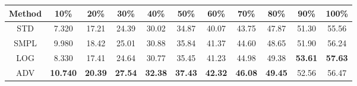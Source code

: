 \documentclass{standalone}
\begin{document}
\begin{tabular}{c|cccccccccc}
      \toprule
      Method & 10\% & 20\% & 30\% & 40\% & 50\% & 60\% & 70\% & 80\% & 90\% & 100\% \\
      \midrule
STD & 7.320 & 17.21 & 24.39 & 30.02 & 34.87 & 40.07 & 43.75 & 47.87 & 51.30 & 55.56\\
SMPL & 9.980 & 18.42 & 25.01 & 30.88 & 35.84 & 41.37 & 44.60 & 48.65 & 51.90 & 56.24\\
LOG & 8.330 & 17.41 & 24.64 & 30.77 & 35.45 & 41.23 & 44.98 & 49.38 & \textbf{53.61} & \textbf{57.63}\\
ADV & \textbf{10.740} & \textbf{20.39} & \textbf{27.54} & \textbf{32.38} & \textbf{37.43} & \textbf{42.32} & \textbf{46.08} & \textbf{49.45} & 52.56 & 56.47\\
  \bottomrule
\end{tabular}
\end{document}
